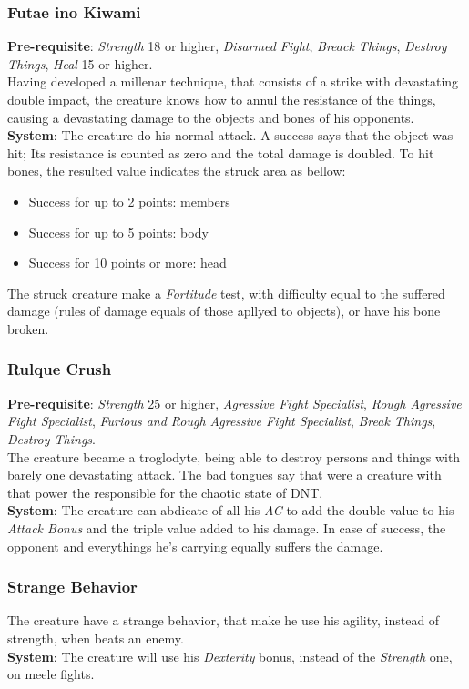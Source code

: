 \documentclass[ letterpaper,12pt]{article}
\begin{document}
\subsubsection{Futae ino Kiwami}
{\bf Pre-requisite}: {\it Strength} 18 or higher, {\it Disarmed Fight}, {\it Breack Things}, {\it Destroy Things}, {\it Heal} 15 or higher.\\
Having developed a millenar technique, that consists of a strike with devastating double impact, the creature knows how to annul the resistance of the things, causing a devastating damage to the objects and bones of his opponents.\\
{\bf System}: The creature do his normal attack. A success says that the object was hit; Its resistance is counted as zero and the total damage is doubled. To hit bones, the resulted value indicates the struck area as bellow:\\
\begin{itemize}
\item{Success for up to 2 points: members}
\item{Success for up to 5 points: body}
\item{Success for 10 points or more: head}
\end{itemize}
The struck creature make a {\it Fortitude} test, with difficulty equal to the suffered damage (rules of damage equals of those apllyed to objects), or have his bone broken.

\subsubsection{Rulque Crush}
{\bf Pre-requisite}: {\it Strength} 25 or higher, {\it Agressive Fight Specialist}, {\it Rough Agressive Fight Specialist}, {\it Furious and Rough Agressive Fight Specialist}, {\it Break Things}, {\it Destroy Things}.\\
The creature became a troglodyte, being able to destroy persons and things with barely one devastating attack. The bad tongues say that were a creature with that power the responsible for the chaotic state of DNT.\\
{\bf System}: The creature can abdicate of all his {\it AC} to add the double value to his {\it Attack Bonus} and the triple value added to his damage. In case of success, the opponent and everythings he's carrying equally suffers the damage.

\subsubsection{Strange Behavior}
The creature have a strange behavior, that make he use his agility, instead of strength, when beats an enemy.\\
{\bf System}: The creature will use his {\it Dexterity} bonus, instead of the {\it Strength} one, on meele fights.\\
\end{document}
